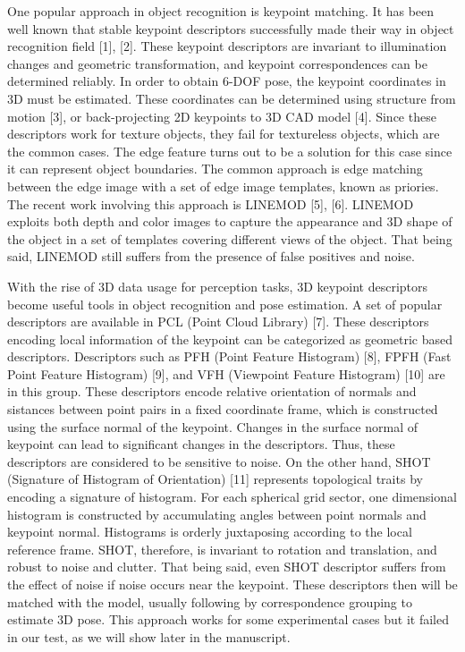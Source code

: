 \documentclass[10]{article}
\begin{document}
One popular approach in object recognition is keypoint matching. It has been well known that stable keypoint descriptors successfully made their way in object recognition field [1], [2]. These keypoint descriptors are invariant to illumination changes and geometric transformation, and keypoint correspondences can be determined reliably. In order to obtain 6-DOF pose, the keypoint coordinates in 3D must be estimated. These coordinates can be determined using structure from motion [3], or back-projecting 2D keypoints to 3D CAD model [4]. Since these descriptors work for texture objects, they fail for textureless objects, which are the common cases. The edge feature turns out to be a solution for this case since it can represent object boundaries. The common approach is edge matching between the edge image with a set of edge image templates, known as priories. The recent work involving this approach is LINEMOD [5], [6]. LINEMOD exploits both depth and color images to capture the appearance and 3D shape of the object in a set of templates covering different views of the object. That being said, LINEMOD still suffers from the presence of false positives and noise.

With the rise of 3D data usage for perception tasks, 3D keypoint descriptors become useful tools in object recognition and pose estimation. A set of popular descriptors are available in PCL (Point Cloud Library) [7]. These descriptors encoding local information of the keypoint can be categorized as geometric based descriptors. Descriptors such as PFH (Point Feature Histogram) [8], FPFH (Fast Point Feature Histogram) [9], and VFH (Viewpoint Feature Histogram) [10] are in this group. These descriptors encode relative orientation of normals and sistances between point pairs in a fixed coordinate frame, which is constructed using the surface normal of the keypoint. Changes in the surface normal of keypoint can lead to significant changes in the descriptors. Thus, these descriptors are considered to be sensitive to noise. On the other hand, SHOT (Signature of Histogram of Orientation) [11] represents topological traits by encoding a signature of histogram. For each spherical grid sector, one dimensional histogram is constructed by accumulating angles between point normals and keypoint normal. Histograms is orderly juxtaposing according to the local reference frame. SHOT, therefore, is invariant to rotation and translation, and robust to noise and clutter. That being said, even SHOT descriptor suffers from the effect of noise if noise occurs near the keypoint. These descriptors then will be matched with the model, usually following by correspondence grouping to estimate 3D pose. This approach works for some experimental cases but it failed in our test, as we will show later in the manuscript.
\end{document}
